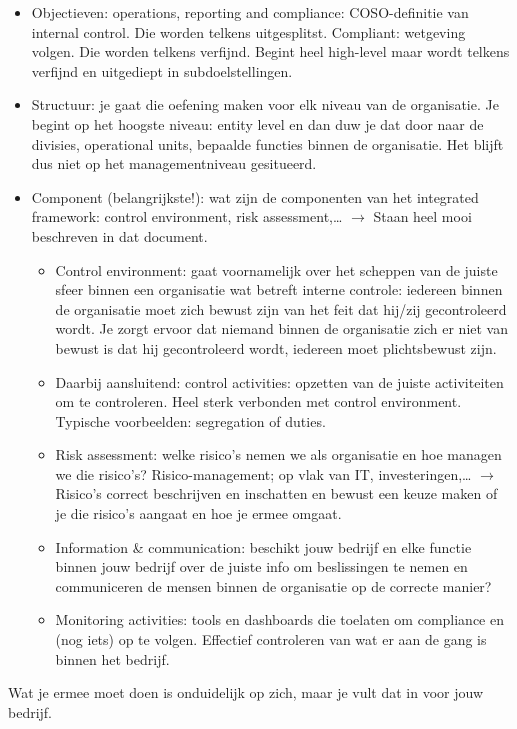 \documentclass[10pt,a4paper]{report}
\begin{document}
\begin{itemize}
\item Objectieven: operations, reporting and compliance: COSO-definitie van internal control. Die worden telkens uitgesplitst. Compliant: wetgeving volgen. Die worden telkens verfijnd. Begint heel high-level maar wordt telkens verfijnd en uitgediept in subdoelstellingen.
\item Structuur: je gaat die oefening maken voor elk niveau van de organisatie. Je begint op het hoogste niveau: entity level en dan duw je dat door naar de divisies, operational units, bepaalde functies binnen de organisatie. Het blijft dus niet op het managementniveau gesitueerd.
\item Component (belangrijkste!): wat zijn de componenten van het integrated framework: control environment, risk assessment,… $\rightarrow$ Staan heel mooi beschreven in dat document.
\begin{itemize}
\item Control environment: gaat voornamelijk over het scheppen van de juiste sfeer binnen een organisatie wat betreft interne controle: iedereen binnen de organisatie moet zich bewust zijn van het feit dat hij/zij gecontroleerd wordt. Je zorgt ervoor dat niemand binnen de organisatie zich er niet van bewust is dat hij gecontroleerd wordt, iedereen moet plichtsbewust zijn. 
\item Daarbij aansluitend: control activities: opzetten van de juiste activiteiten om te controleren. Heel sterk verbonden met control environment. Typische voorbeelden: segregation of duties. 
\item Risk assessment: welke risico's nemen we als organisatie en hoe managen we die risico's? Risico-management; op vlak van IT, investeringen,… $\rightarrow$ Risico's correct beschrijven en inschatten en bewust een keuze maken of je die risico's aangaat en hoe je ermee omgaat. 
\item Information \& communication: beschikt jouw bedrijf en elke functie binnen jouw bedrijf over de juiste info om beslissingen te nemen en communiceren de mensen binnen de organisatie op de correcte manier? 
\item Monitoring activities: tools en dashboards die toelaten om compliance en (nog iets) op te volgen. Effectief controleren van wat er aan de gang is binnen het bedrijf.
\end{itemize}
\end{itemize}
Wat je ermee moet doen is onduidelijk op zich, maar je vult dat in voor jouw bedrijf.
\end{document}
